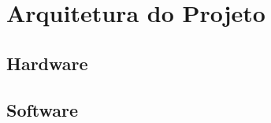 \documentclass[../delivery_hospital_report.tex]{subfiles}
\begin{document}
\chapter{Arquitetura do Projeto}
\section{Hardware}
\section{Software}
\end{document}
